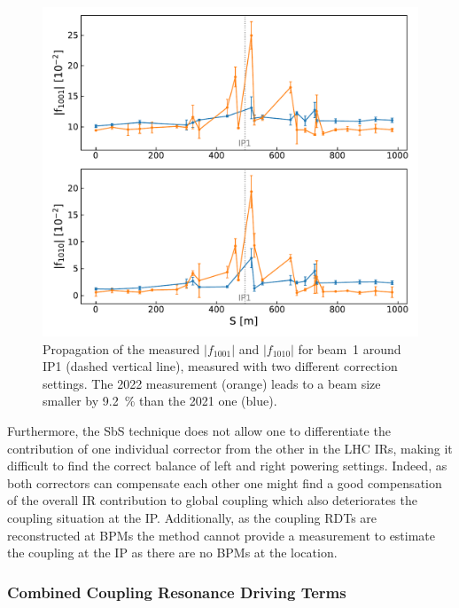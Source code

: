 \begin{figure}[!htb]
    \centering
    \includegraphics*[width=\textwidth]{Figures/IR_Coupling_Correction/sbs_coupling_b1_ir1_compare_2021_2022_colin_delta_minus4.pdf}
    \caption{Propagation of the measured \(|f_{1001}|\) and \(|f_{1010}|\) for beam~\num{1} around IP\num{1} (dashed vertical line), measured with two different correction settings. The \num{2022} measurement (\textcolor{mplorange}{orange}) leads to a beam size smaller by \qty{9.2}{\percent} than the \num{2021} one (\textcolor{mplblue}{blue}).}
    \label{figure:beamtest_vs_2022_sbs_abs_f1001_ir1}
\end{figure}

Furthermore, the SbS technique does not allow one to differentiate the contribution of one individual corrector from the other in the LHC IRs, making it difficult to find the correct balance of left and right powering settings.
Indeed, as both correctors can compensate each other one might find a good compensation of the overall IR contribution to global coupling which also deteriorates the coupling situation at the IP.
Additionally, as the coupling RDTs are reconstructed at BPMs the method cannot provide a measurement to estimate the coupling at the IP as there are no BPMs at the location.

\subsubsection*{Combined Coupling Resonance Driving Terms}

